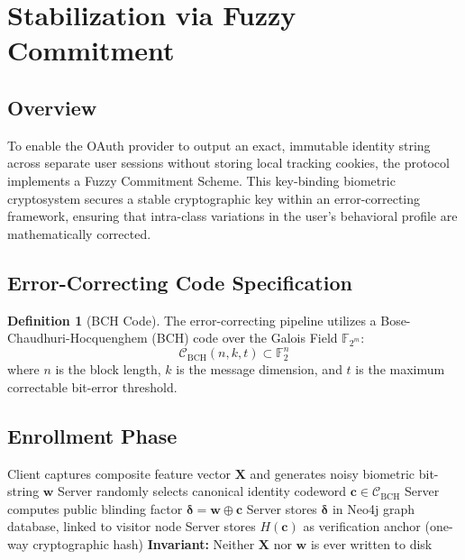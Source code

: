 \documentclass[11pt,twoside]{amsart}
\theoremstyle{plain}
\theoremstyle{definition}
\newtheorem{definition}[theorem]{Definition}
\theoremstyle{remark}
\newcommand{\bX}{\mathbf{X}}
\newcommand{\bw}{\mathbf{w}}
\newcommand{\bc}{\mathbf{c}}
\newcommand{\bdelta}{\boldsymbol{\delta}}
\newcommand{\calC}{\mathcal{C}}
\newcommand{\bbF}{\mathbb{F}}
\begin{document}
\section{Stabilization via Fuzzy Commitment}

\subsection{Overview}

To enable the OAuth provider to output an exact, immutable identity string across separate user sessions without storing local tracking cookies, the protocol implements a Fuzzy Commitment Scheme. This key-binding biometric cryptosystem secures a stable cryptographic key within an error-correcting framework, ensuring that intra-class variations in the user's behavioral profile are mathematically corrected.

\subsection{Error-Correcting Code Specification}

\begin{definition}[BCH Code]
\label{def:bch}
The error-correcting pipeline utilizes a Bose-Chaudhuri-Hocquenghem (BCH) code over the Galois Field $\bbF_{2^m}$:
\begin{equation}
\calC_{\text{BCH}}(n, k, t) \subset \bbF_2^n
\end{equation}
where $n$ is the block length, $k$ is the message dimension, and $t$ is the maximum correctable bit-error threshold.
\end{definition}

\subsection{Enrollment Phase}

\begin{algorithm}[htbp]
\caption{BBID Enrollment}
\label{alg:enroll}
\begin{algorithmic}[1]
\State Client captures composite feature vector $\bX$ and generates noisy biometric bit-string $\bw$
\State Server randomly selects canonical identity codeword $\bc \in \calC_{\text{BCH}}$
\State Server computes public blinding factor $\bdelta = \bw \oplus \bc$
\State Server stores $\bdelta$ in Neo4j graph database, linked to visitor node
\State Server stores $H(\bc)$ as verification anchor (one-way cryptographic hash)
\State \textbf{Invariant:} Neither $\bX$ nor $\bw$ is ever written to disk
\end{algorithmic}
\end{algorithm}
\end{document}
